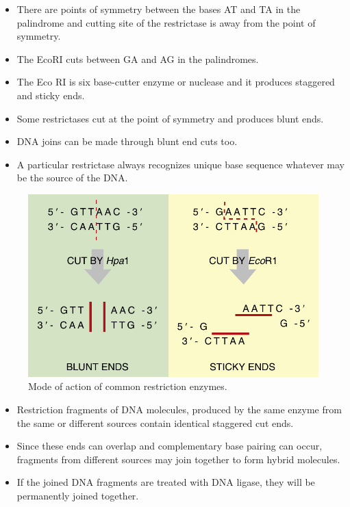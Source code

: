 \documentclass[11pt,dvipsnames,ignorenonframetext,aspectratio=169]{beamer}
\providecommand{\tightlist}{%
  \setlength{\itemsep}{0pt}\setlength{\parskip}{0pt}}
\begin{document}
\begin{frame}{}
\protect\hypertarget{section-9}{}

\begin{itemize}
\tightlist
\item
  There are points of symmetry between the bases AT and TA in the
  palindrome and cutting site of the restrictase is away from the point
  of symmetry.
\item
  The EcoRI cuts between GA and AG in the palindromes.
\item
  The Eco RI is six base-cutter enzyme or nuclease and it produces
  staggered and sticky ends.
\item
  Some restrictases cut at the point of symmetry and produces blunt
  ends.
\item
  DNA joins can be made through blunt end cuts too.
\item
  A particular restrictase always recognizes unique base sequence
  whatever may be the source of the DNA.
\end{itemize}

\end{frame}

\begin{frame}{}
\protect\hypertarget{section-10}{}

\begin{figure}
\includegraphics[width=0.45\linewidth]{./../images/restriction_enzymes} \caption{Mode of action of common restriction enzymes.}\label{fig:restriction-enzymes}
\end{figure}

\end{frame}

\begin{frame}{}
\protect\hypertarget{section-11}{}

\begin{itemize}
\tightlist
\item
  Restriction fragments of DNA molecules, produced by the same enzyme
  from the same or different sources contain identical staggered cut
  ends.
\item
  Since these ends can overlap and complementary base pairing can occur,
  fragments from different sources may join together to form hybrid
  molecules.
\item
  If the joined DNA fragments are treated with DNA ligase, they will be
  permanently joined together.
\end{itemize}

\end{frame}
\end{document}
